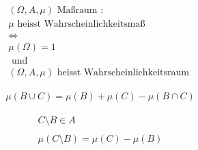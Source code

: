 \documentclass[a4paper]{article}
\begin{document}
{	{
		\begin{gather*}
			(\Omega, A, \mu) \text{ Maßraum }: \\
			\mu \text{ heisst Wahrscheinlichkeitsmaß } \\
			\Leftrightarrow \\
			\mu (\Omega) = 1 \\
			\text{ und } \\
			(\Omega, A, \mu) \text{ heisst Wahrscheinlichkeitsraum }
		\end{gather*}
	}
	\newpage

	{
		\begin{gather*}
			\mu \left(
				B \cup C
			\right) = \mu (B) + \mu (C) - \mu \left(
				B \cap C
			\right) 
		\end{gather*}
	}
	\newpage

	{
		\begin{gather*}
			C \setminus B \in A \\
			\\
			\mu \left(
				C \setminus B
			\right) =
			\mu (C) - \mu (B)
		\end{gather*}
	}
	\newpage

}
\end{document}
